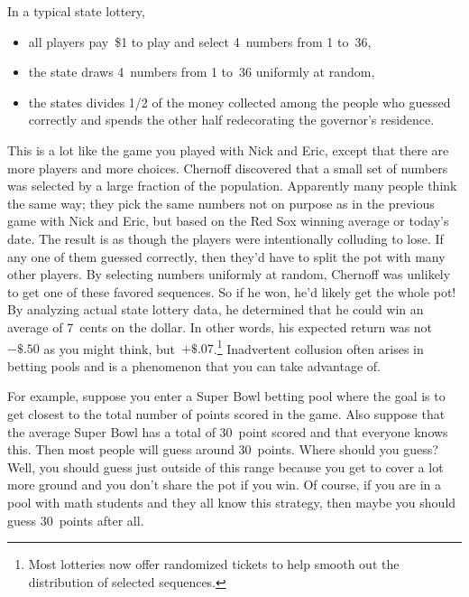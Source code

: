In a typical state lottery,
\begin{itemize}

\item all players pay~\$1 to play and select 4~numbers from 1 to~36,

\item the state draws 4~numbers from 1 to~36 uniformly at random,

\item the states divides 1/2 of the money collected among the people
  who guessed correctly and spends the other half redecorating the
  governor's residence.

\end{itemize}
This is a lot like the game you played with Nick and Eric, except that
there are more players and more choices.  Chernoff discovered that a
small set of numbers was selected by a large fraction of the
population.  Apparently many people think the same way; they pick the
same numbers not on purpose as in the previous game with Nick and
Eric, but based on the Red Sox winning average or today's date.  The
result is as though the players were intentionally colluding to lose.
If any one of them guessed correctly, then they'd have to split the
pot with many other players.  By selecting numbers uniformly at
random, Chernoff was unlikely to get one of these favored sequences.
So if he won, he'd likely get the whole pot!  By analyzing actual
state lottery data, he determined that he could win an average of
7~cents on the dollar.  In other words, his expected return was
not~$-\${.}50$ as you might think, but~$+\${.}07$.\footnote{Most
  lotteries now offer randomized tickets to help smooth out the
  distribution of selected sequences.}
Inadvertent collusion often arises in betting pools and is a
phenomenon that you can take advantage of.

\begin{editingnotes}
For example, suppose you
enter a Super Bowl betting pool where the goal is to get closest to
the total number of points scored in the game.  Also suppose that the
average Super Bowl has a total of 30~point scored and that everyone
knows this.  Then most people will guess around 30~points.  Where
should you guess?  Well, you should guess just outside of this range
because you get to cover a lot more ground and you don't share the pot
if you win.  Of course, if you are in a pool with math students and
they all know this strategy, then maybe you should guess 30~points
after all.
\end{editingnotes}

